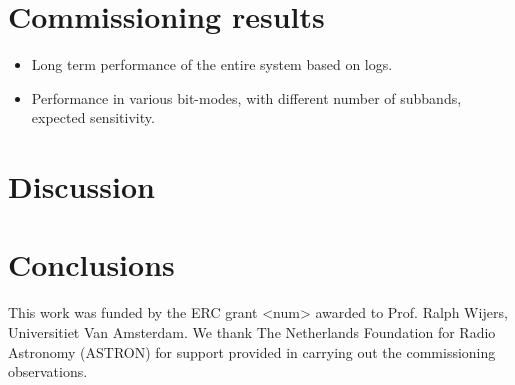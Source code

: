 \documentclass{aa}
\begin{document}
\section {\label{sec:results} Commissioning results}
\begin {itemize}
 \item {Long term performance of the entire system based on logs.}
 \item {Performance  in various  bit-modes, with  different number  of subbands,
   expected sensitivity.}
\end {itemize}

\section {\label{sec:discussion} Discussion}

\section {\label{sec:conclusion} Conclusions}

\begin {acknowledgements}

This work  was funded  by the ERC  grant <num> awarded  to Prof.   Ralph Wijers,
Universitiet  Van Amsterdam.   We  thank The  Netherlands  Foundation for  Radio
Astronomy  (ASTRON)  for support  provided  in  carrying out  the  commissioning
observations.
\end{acknowledgements}


\end{document}
